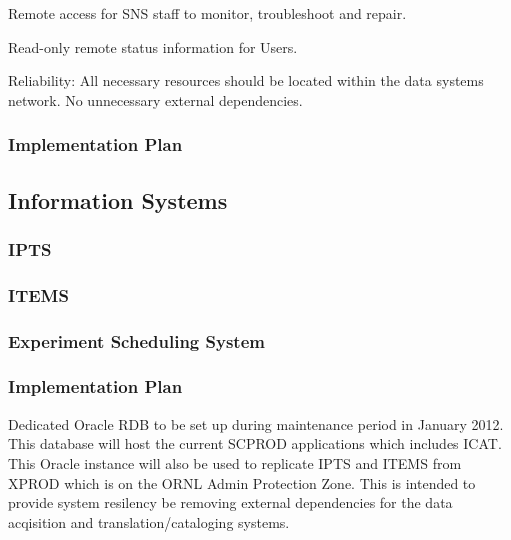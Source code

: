 Remote access for SNS staff to monitor, troubleshoot and repair.

Read-only remote status information for Users.

Reliability: All necessary resources should be located within the data systems
network. No unnecessary external dependencies.

\subsubsection{Implementation Plan}


\subsection{Information Systems}

\subsubsection{IPTS}

\subsubsection{ITEMS}

\subsubsection{Experiment Scheduling System}

\subsubsection{Implementation Plan}

Dedicated Oracle RDB to be set up during maintenance period in January
2012. This database will host the current SCPROD applications which
includes ICAT. This Oracle instance will also be used to replicate IPTS
and ITEMS from XPROD which is on the ORNL Admin Protection Zone.  This is
intended to provide system resilency be removing external dependencies
for the data acqisition and translation/cataloging systems.


